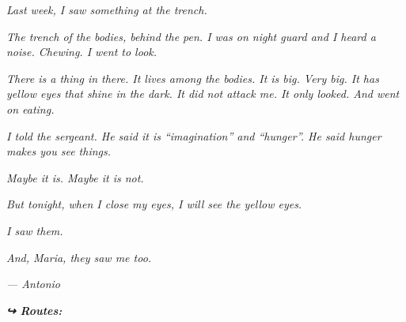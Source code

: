 \noindent \textit{Last week, I saw something at the trench.}

\noindent \textit{The trench of the bodies, behind the pen. I was on night guard and I heard a noise. Chewing. I went to look.}

\noindent \textit{There is a thing in there. It lives among the bodies. It is big. Very big. It has yellow eyes that shine in the dark. It did not attack me. It only looked. And went on eating.}

\noindent \textit{I told the sergeant. He said it is \textquotedblleft{}imagination\textquotedblright{} and \textquotedblleft{}hunger\textquotedblright{}. He said hunger makes you see things.}

\noindent \textit{Maybe it is. Maybe it is not.}

\noindent \textit{But tonight, when I close my eyes, I will see the yellow eyes.}

\noindent \textit{I saw them.}

\noindent \textit{And, Maria, they saw me too.}

\noindent \textit{--- Antonio}

\vspace{0.5em}
\noindent\textit{\textbf{↪ Routes:}  \rotasep {}}
